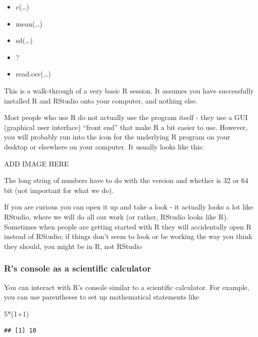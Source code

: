 \documentclass[
]{book}
\newenvironment{Shaded}{\begin{snugshade}}{\end{snugshade}}
\newcommand{\DecValTok}[1]{\textcolor[rgb]{0.00,0.00,0.81}{#1}}
\newcommand{\NormalTok}[1]{#1}
\newcommand{\SpecialCharTok}[1]{\textcolor[rgb]{0.00,0.00,0.00}{#1}}
\providecommand{\tightlist}{%
  \setlength{\itemsep}{0pt}\setlength{\parskip}{0pt}}
\begin{document}
\begin{itemize}
\tightlist
\item
  c(\ldots)
\item
  mean(\ldots)
\item
  sd(\ldots)
\item
  ?
\item
  read.csv(\ldots)
\end{itemize}

This is a walk-through of a very basic R session. It assumes you have successfully installed R and RStudio onto your computer, and nothing else.

Most people who use R do not actually use the program itself - they use a GUI (graphical user interface) ``front end'' that make R a bit easier to use. However, you will probably run into the icon for the underlying R program on your desktop or elsewhere on your computer. It usually looks like this:

ADD IMAGE HERE

The long string of numbers have to do with the version and whether is 32 or 64 bit (not important for what we do).

If you are curious you can open it up and take a look - it actually looks a lot like RStudio, where we will do all our work (or rather, RStudio looks like R). Sometimes when people are getting started with R they will accidentally open R instead of RStudio; if things don't seem to look or be working the way you think they should, you might be in R, not RStudio

\hypertarget{rs-console-as-a-scientific-calculator}{%
\subsubsection{R's console as a scientific calculator}\label{rs-console-as-a-scientific-calculator}}

You can interact with R's console similar to a scientific calculator. For example, you can use parentheses to set up mathematical statements like

\begin{Shaded}
\begin{Highlighting}[]
\DecValTok{5}\SpecialCharTok{*}\NormalTok{(}\DecValTok{1}\SpecialCharTok{+}\DecValTok{1}\NormalTok{)}
\end{Highlighting}
\end{Shaded}

\begin{verbatim}
## [1] 10
\end{verbatim}
\end{document}
